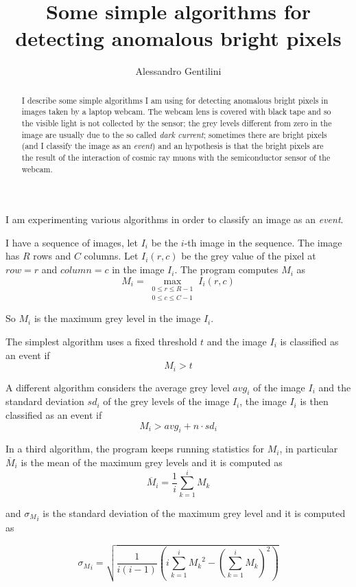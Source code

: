 \documentclass[a4paper,12pt]{article}
\title{Some simple algorithms for detecting anomalous bright pixels}
\author{Alessandro Gentilini}
\begin{document}
\maketitle

\begin{abstract}
I describe some simple algorithms I am using for detecting anomalous bright pixels in images taken by a laptop webcam.
The webcam lens is covered with black tape and so the visible light is not collected by the sensor; the grey levels different from zero in the image are usually due to the so called \emph{dark current}; sometimes there are bright pixels (and I classify the image as an \emph{event}) and an hypothesis is that the bright pixels are the result of the interaction of cosmic ray muons with the semiconductor sensor of the webcam.
\end{abstract} 

I am experimenting various algorithms in order to classify an image as an \emph{event}.

I have a sequence of images, let $I_i$ be the $i$-th image in the sequence. The image has $R$ rows and $C$ columns. Let $I_i(r,c)$ be the grey value of the pixel at $row=r$ and $column=c$ in the image $I_i$.
The program computes $M_i$ as 
$$M_i=\max_{\substack{
   0\leq r\leq R-1 \\
   0\leq c\leq C-1
  }}
 I_i(r,c)$$

So $M_i$ is the maximum grey level in the image $I_i$.

The simplest algorithm uses a fixed threshold $t$ and the image $I_i$ is classified as an event if 
\begin{equation}
M_i>t
\end{equation}

A different algorithm considers the average grey level $avg_i$ of the image $I_i$ and the standard deviation $sd_i$ of the grey levels of the image $I_i$, the image $I_i$ is then classified as an event if 
\begin{equation}
M_i>avg_i+n\cdot sd_i
\end{equation}

 In a third algorithm, the program keeps running statistics for $M_i$, in particular $\overline{M}_i$ is the mean of the maximum grey levels and it is computed as
 $$\overline{M}_i=\frac{1}{i}\sum_{k=1}^i M_k$$

 and ${\sigma_{M}}_{i}$ is the standard deviation of the maximum grey level and it is computed as

 $${\sigma_{M}}_{i}=\sqrt{\frac{1}{i(i-1)}\left(i\sum_{k=1}^i {M_k}^2-\left(\sum_{k=1}^i M_k\right)^2\right)}$$
\end{document}
